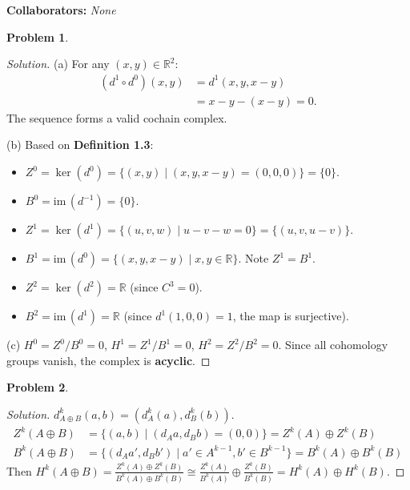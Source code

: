 \documentclass[12pt, a4paper]{article}
\theoremstyle{definition}
\newtheorem{problem}{Problem}
\newenvironment{solution}
  {\renewcommand\qedsymbol{$\blacksquare$}\begin{proof}[Solution]}
  {\end{proof}}
\newcommand{\R}{\mathbb{R}}
\newcommand{\im}{\text{im}\,}
\begin{document}
\noindent \textbf{Collaborators:} \textit{None}
\vspace{0.8cm}

\begin{problem}
\end{problem}

\begin{solution}
(a) For any $(x, y) \in \R^2$:
\begin{align*}
    (d^1 \circ d^0)(x, y) &= d^1(x, y, x - y) \\
    &= x - y - (x - y) = 0.
\end{align*}
The sequence forms a valid cochain complex.

(b) Based on \textbf{Definition 1.3}:
\begin{itemize}[nosep]
    \item $Z^0 = \ker(d^0) = \{(x, y) \mid (x, y, x-y)=(0,0,0)\} = \{0\}$.
    \item $B^0 = \im(d^{-1}) = \{0\}$.
    \item $Z^1 = \ker(d^1) = \{(u, v, w) \mid u-v-w=0\} = \{(u, v, u-v)\}$.
    \item $B^1 = \im(d^0) = \{(x, y, x-y) \mid x,y \in \R\}$. Note $Z^1 = B^1$.
    \item $Z^2 = \ker(d^2) = \R$ (since $C^3=0$).
    \item $B^2 = \im(d^1) = \R$ (since $d^1(1,0,0)=1$, the map is surjective).
\end{itemize}

(c) $H^0 = Z^0/B^0 = 0$, $H^1 = Z^1/B^1 = 0$, $H^2 = Z^2/B^2 = 0$. 
Since all cohomology groups vanish, the complex is \textbf{acyclic}.
\end{solution}

\begin{problem}
\end{problem}

\begin{solution}
$d^k_{A \oplus B}(a, b) = (d^k_A(a), d^k_B(b))$. 
\begin{align*}
    Z^k(A \oplus B) &= \{(a, b) \mid (d_A a, d_B b) = (0, 0)\} = Z^k(A) \oplus Z^k(B) \\
    B^k(A \oplus B) &= \{(d_A a', d_B b') \mid a' \in A^{k-1}, b' \in B^{k-1}\} = B^k(A) \oplus B^k(B)
\end{align*}
Then $H^k(A \oplus B) = \frac{Z^k(A) \oplus Z^k(B)}{B^k(A) \oplus B^k(B)} \cong \frac{Z^k(A)}{B^k(A)} \oplus \frac{Z^k(B)}{B^k(B)} = H^k(A) \oplus H^k(B)$.
\end{solution}
\end{document}
